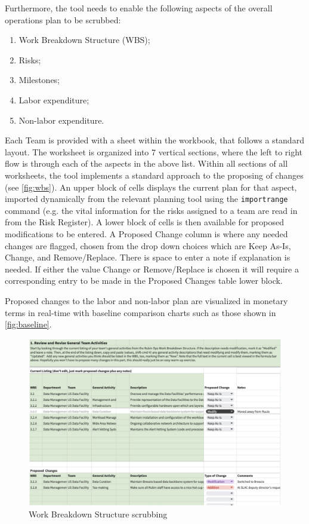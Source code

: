 \noindent Furthermore, the tool needs to enable the following aspects of the overall operations plan to be scrubbed:
\begin{enumerate}
\item Work Breakdown Structure (WBS);
\item Risks;
\item Milestones;
\item Labor expenditure;
\item Non-labor expenditure.
\end{enumerate}
Each Team is provided with a sheet within the workbook, that follows a standard layout. 
The worksheet is organized into 7 vertical sections, where the left to right flow is through each of the aspects in the above list. 
Within all sections of all worksheets, the tool implements a standard approach to the proposing of changes (see \autoref{fig:wbs}).
An upper block of cells displays the current plan for that aspect, imported dynamically from the relevant planning tool using the \texttt{importrange} command (e.g. the vital information for the risks assigned to a team are read in from the Risk Register).
A lower block of cells is then available for proposed modifications to be entered.
A Proposed Change column is where any needed changes are flagged, chosen from the drop down choices which are Keep As-Is, Change, and Remove/Replace. 
There is space to enter a note if explanation is needed.
If either the value Change or Remove/Replace is chosen it will require a corresponding entry to be made in the Proposed Changes table lower block.

Proposed changes to the labor and non-labor plan are visualized in monetary terms in real-time with baseline comparison charts such as those shown in \autoref{fig:baseline}.



\begin{figure}[h!]
\begin{centering}
\includegraphics[width=1.0\textwidth]{Figure4WorkBreakdownStructurescrubbing}
	\caption{ Work Breakdown Structure scrubbing
\label{fig:wbs}}
\end{centering}
\end{figure}

